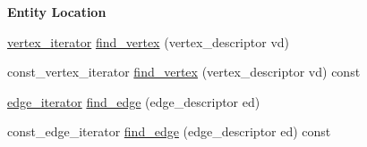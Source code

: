 \begin{Indent}{\bf Entity Location}\par
\begin{DoxyCompactItemize}
\item 
\hyperlink{classmystl_1_1graph_a173b6e21e17fd9bafdd7594b2ba3ef0a}{vertex\+\_\+iterator} \hyperlink{classmystl_1_1graph_a9f9e02fc5c47418c60e60283aad779fa}{find\+\_\+vertex} (vertex\+\_\+descriptor vd)
\item 
const\+\_\+vertex\+\_\+iterator \hyperlink{classmystl_1_1graph_af0c7dfb55a41898adb8523b0fb95e9d9}{find\+\_\+vertex} (vertex\+\_\+descriptor vd) const 
\item 
\hyperlink{classmystl_1_1graph_aca4e86526b9606bc4a568b0c4e127b3f}{edge\+\_\+iterator} \hyperlink{classmystl_1_1graph_a6b9303727279b373f93a7a7b2117601b}{find\+\_\+edge} (edge\+\_\+descriptor ed)
\item 
const\+\_\+edge\+\_\+iterator \hyperlink{classmystl_1_1graph_a63796b6ea4e3dd28ce7e690257a90ffc}{find\+\_\+edge} (edge\+\_\+descriptor ed) const 
\end{DoxyCompactItemize}
\end{Indent}

